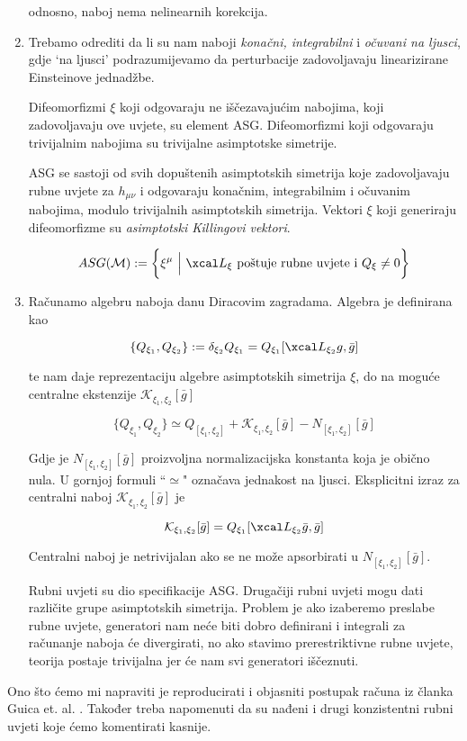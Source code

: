 \begin{enumerate}
odnosno, naboj nema nelinearnih korekcija.
\item Trebamo odrediti da li su nam naboji \textit{konačni, integrabilni} i \textit{očuvani na ljusci}, gdje `na ljusci' podrazumijevamo da perturbacije zadovoljavaju linearizirane Einsteinove jednadžbe. 

Difeomorfizmi $\xi$ koji odgovaraju ne iščezavajućim nabojima, koji zadovoljavaju ove uvjete, su element ASG. Difeomorfizmi koji odgovaraju trivijalnim nabojima su trivijalne asimptotske simetrije.

ASG se sastoji od svih dopuštenih asimptotskih simetrija koje zadovoljavaju rubne uvjete za $h_{\mu\nu}$ i odgovaraju konačnim, integrabilnim i očuvanim nabojima, modulo trivijalnih asimptotskih simetrija. Vektori $\xi$ koji generiraju difeomorfizme su \textit{asimptotski Killingovi vektori}.

\begin{equation*}
ASG(\mathcal{M}):=\bigg\{\xi^\mu\ \Big\vert\ \Lie_\xi\ \textrm{poštuje rubne uvjete i}\ Q_\xi\neq 0\bigg\}
\end{equation*}

\item Računamo algebru naboja danu Diracovim zagradama. Algebra je definirana kao

\begin{equation*}
\{Q_{\xi_1},Q_{\xi_2}\}:=\delta_{\xi_2}Q_{\xi_1}=Q_{\xi_1}[\Lie_{\xi_2}g,\bar{g}]
\end{equation*}

te nam daje reprezentaciju algebre asimptotskih simetrija $\xi$, do na moguće centralne ekstenzije $\mathcal{K}_{\xi_1,\xi_2}[\bar{g}]$

\begin{equation*}
\{Q_{\xi_1},Q_{\xi_2}\}\simeq Q_{[\xi_1,\xi_2]}+\mathcal{K}_{\xi_1,\xi_2}[\bar{g}]-N_{[\xi_1,\xi_2]}[\bar{g}]
\end{equation*}

Gdje je $N_{[\xi_1,\xi_2]}[\bar{g}]$ proizvoljna normalizacijska konstanta koja je obično nula. U gornjoj formuli ``$\simeq$" označava jednakost na ljusci.
Eksplicitni izraz za centralni naboj $\mathcal{K}_{\xi_1,\xi_2}[\bar{g}]$ je

\begin{equation*}
\mathcal{K}_{\xi_1,\xi_2}[\bar{g}]=Q_{\xi_1}[\Lie_{\xi_2}\bar{g},\bar{g}]
\end{equation*}

Centralni naboj je netrivijalan ako se ne može apsorbirati u $N_{[\xi_1,\xi_2]}[\bar{g}]$. 

Rubni uvjeti su dio specifikacije ASG. Drugačiji rubni uvjeti mogu dati različite grupe asimptotskih simetrija. Problem je ako izaberemo preslabe rubne uvjete, generatori nam neće biti dobro definirani i integrali za računanje naboja će divergirati, no ako stavimo prerestriktivne rubne uvjete, teorija postaje trivijalna jer će nam
svi generatori iščeznuti.
\end{enumerate}

Ono što ćemo mi napraviti je reproducirati i objasniti postupak računa iz članka Guica et. al. \citep{Guica:2008mu}. Također treba napomenuti da su nađeni i drugi konzistentni rubni uvjeti \citep{Matsuo:2009sj, Matsuo:2009pg} koje ćemo komentirati kasnije.





